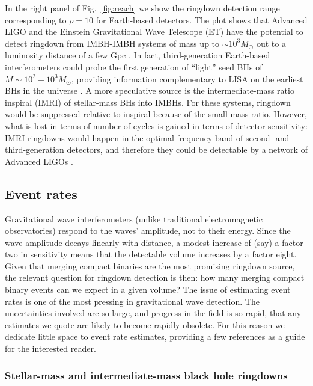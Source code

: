 \documentclass[]{iopart}
\begin{document}
In the right panel of Fig.~\ref{fig:reach} we show the ringdown detection
range corresponding to $\rho=10$ for Earth-based detectors. The plot shows
that Advanced LIGO and the Einstein Gravitational Wave Telescope (ET) have the
potential to detect ringdown from IMBH-IMBH systems of mass up to $\sim
10^3M_\odot$ out to a luminosity distance of a few Gpc
\cite{Fregeau:2006yz}. In fact, third-generation Earth-based interferometers
could probe the first generation of ``light'' seed BHs of $M\sim
10^2-10^3M_\odot$, providing information complementary to LISA on the earliest
BHs in the universe \cite{Sesana:2009wg}. A more speculative source is the
intermediate-mass ratio inspiral (IMRI) of stellar-mass BHs into IMBHs. For
these systems, ringdown would be suppressed relative to inspiral because of
the small mass ratio. However, what is lost in terms of number of cycles is
gained in terms of detector sensitivity: IMRI ringdowns would happen in the
optimal frequency band of second- and third-generation detectors, and
therefore they could be detectable by a network of Advanced LIGOs
\cite{Mandel:2007hi}.

\subsection{Event rates}

Gravitational wave interferometers (unlike traditional electromagnetic
observatories) respond to the waves' amplitude, not to their energy. Since the
wave amplitude decays linearly with distance, a modest increase of (say) a
factor two in sensitivity means that the detectable volume increases by a
factor eight. Given that merging compact binaries are the most promising
ringdown source, the relevant question for ringdown detection is then: how
many merging compact binary events can we expect in a given volume? The issue
of estimating event rates is one of the most pressing in gravitational wave
detection. The uncertainties involved are so large, and progress in the field
is so rapid, that any estimates we quote are likely to become rapidly
obsolete. For this reason we dedicate little space to event rate estimates,
providing a few references as a guide for the interested reader.

\subsubsection*{Stellar-mass and intermediate-mass black hole ringdowns}
\end{document}
